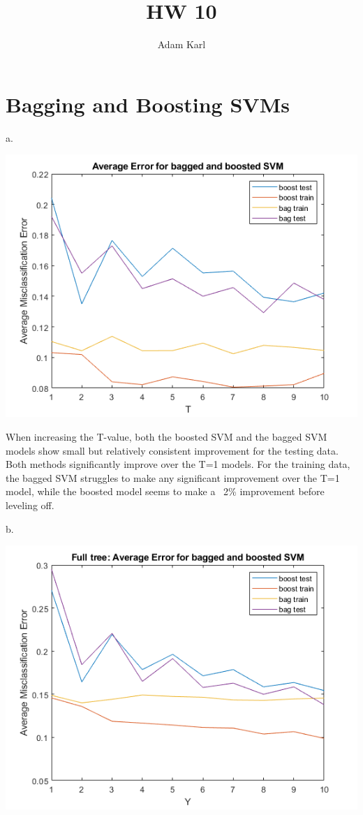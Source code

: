 \documentclass{article}
\title{HW 10}
\author{Adam Karl}
\begin{document}
\maketitle

\section{Bagging and Boosting SVMs}

a.

\begin{center}
    \includegraphics[scale=1]{a.png}
\end{center}

\noindent
When increasing the T-value, both the boosted SVM and the bagged SVM models show small but relatively consistent improvement for the testing data. Both methods significantly improve over the T=1 models. For the training data, the bagged SVM struggles to make any significant improvement over the T=1 model, while the boosted model seems to make a ~2\% improvement before leveling off.

\medskip
\noindent
b.

\begin{center}
    \includegraphics[scale=1]{b.png}
\end{center}
\end{document}

